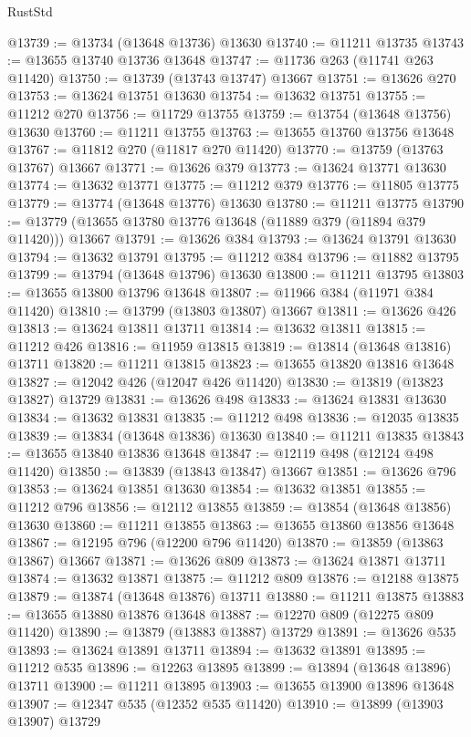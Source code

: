 \begin{lexlean}{RustStd}
\begin{coremodule}
@13739 := @13734 (@13648 @13736) @13630
@13740 := @11211 @13735
@13743 := @13655 @13740 @13736 @13648
@13747 := @11736 @263 (@11741 @263 @11420)
@13750 := @13739 (@13743 @13747) @13667
@13751 := @13626 @270
@13753 := @13624 @13751 @13630
@13754 := @13632 @13751
@13755 := @11212 @270
@13756 := @11729 @13755
@13759 := @13754 (@13648 @13756) @13630
@13760 := @11211 @13755
@13763 := @13655 @13760 @13756 @13648
@13767 := @11812 @270 (@11817 @270 @11420)
@13770 := @13759 (@13763 @13767) @13667
@13771 := @13626 @379
@13773 := @13624 @13771 @13630
@13774 := @13632 @13771
@13775 := @11212 @379
@13776 := @11805 @13775
@13779 := @13774 (@13648 @13776) @13630
@13780 := @11211 @13775
@13790 := @13779 (@13655 @13780 @13776 @13648 (@11889 @379 (@11894 @379 @11420))) @13667
@13791 := @13626 @384
@13793 := @13624 @13791 @13630
@13794 := @13632 @13791
@13795 := @11212 @384
@13796 := @11882 @13795
@13799 := @13794 (@13648 @13796) @13630
@13800 := @11211 @13795
@13803 := @13655 @13800 @13796 @13648
@13807 := @11966 @384 (@11971 @384 @11420)
@13810 := @13799 (@13803 @13807) @13667
@13811 := @13626 @426
@13813 := @13624 @13811 @13711
@13814 := @13632 @13811
@13815 := @11212 @426
@13816 := @11959 @13815
@13819 := @13814 (@13648 @13816) @13711
@13820 := @11211 @13815
@13823 := @13655 @13820 @13816 @13648
@13827 := @12042 @426 (@12047 @426 @11420)
@13830 := @13819 (@13823 @13827) @13729
@13831 := @13626 @498
@13833 := @13624 @13831 @13630
@13834 := @13632 @13831
@13835 := @11212 @498
@13836 := @12035 @13835
@13839 := @13834 (@13648 @13836) @13630
@13840 := @11211 @13835
@13843 := @13655 @13840 @13836 @13648
@13847 := @12119 @498 (@12124 @498 @11420)
@13850 := @13839 (@13843 @13847) @13667
@13851 := @13626 @796
@13853 := @13624 @13851 @13630
@13854 := @13632 @13851
@13855 := @11212 @796
@13856 := @12112 @13855
@13859 := @13854 (@13648 @13856) @13630
@13860 := @11211 @13855
@13863 := @13655 @13860 @13856 @13648
@13867 := @12195 @796 (@12200 @796 @11420)
@13870 := @13859 (@13863 @13867) @13667
@13871 := @13626 @809
@13873 := @13624 @13871 @13711
@13874 := @13632 @13871
@13875 := @11212 @809
@13876 := @12188 @13875
@13879 := @13874 (@13648 @13876) @13711
@13880 := @11211 @13875
@13883 := @13655 @13880 @13876 @13648
@13887 := @12270 @809 (@12275 @809 @11420)
@13890 := @13879 (@13883 @13887) @13729
@13891 := @13626 @535
@13893 := @13624 @13891 @13711
@13894 := @13632 @13891
@13895 := @11212 @535
@13896 := @12263 @13895
@13899 := @13894 (@13648 @13896) @13711
@13900 := @11211 @13895
@13903 := @13655 @13900 @13896 @13648
@13907 := @12347 @535 (@12352 @535 @11420)
@13910 := @13899 (@13903 @13907) @13729

\end{coremodule}
\end{lexlean}
